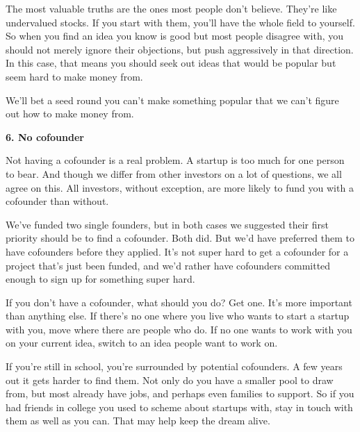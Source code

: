 The most valuable truths are the ones
                    most people don't believe. They're like undervalued stocks.
                    If you start with them, you'll have the whole field to
                    yourself. So when you find an idea you know is good but most
                    people disagree with, you should not merely ignore their
                    objections, but push aggressively in that direction. In this
                    case, that means you should seek out ideas that would be
                    popular but seem hard to make money from.

We'll
                    bet a seed round you can't make something popular that we
                    can't figure out how to make money from.

\textbf{6. No cofounder}

Not having a cofounder is a real problem. A
                    startup is too much for one person to bear. And though we
                    differ from other investors on a lot of questions, we all
                    agree on this. All investors, without exception, are more
                    likely to fund you with a cofounder than without.

We've
                    funded two single founders, but in both cases we suggested
                    their first priority should be to find a cofounder. Both
                    did. But we'd have preferred them to have cofounders before
                    they applied. It's not super hard to get a cofounder for a
                    project that's just been funded, and we'd rather have
                    cofounders committed enough to sign up for something super
                    hard.

If you don't have a cofounder, what should
                    you do? Get one. It's more important than anything else. If
                    there's no one where you live who wants to start a startup
                    with you, move where there are people who do. If no one
                    wants to work with you on your current idea, switch to an
                    idea people want to work on.

If you're still in
                    school, you're surrounded by potential cofounders. A few
                    years out it gets harder to find them. Not only do you have
                    a smaller pool to draw from, but most already have jobs, and
                    perhaps even families to support. So if you had friends in
                    college you used to scheme about startups with, stay in
                    touch with them as well as you can. That may help keep the
                    dream alive.

